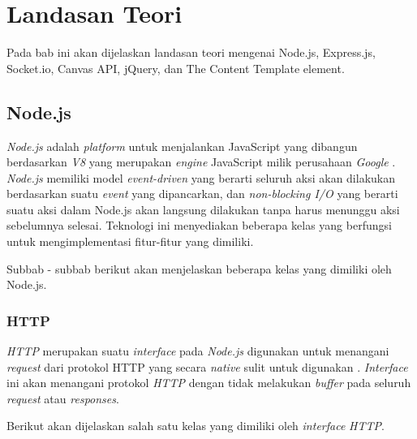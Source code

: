 \chapter{Landasan Teori}
\label{chap:teori}

Pada bab ini akan dijelaskan landasan teori mengenai Node.js, Express.js, Socket.io, Canvas API, jQuery, dan The Content Template element.

\section{Node.js}
\label{sec:Node.js}

\textit{Node.js} adalah \textit{platform} untuk menjalankan JavaScript yang dibangun berdasarkan \textit{V8} yang merupakan \textit{engine} JavaScript milik perusahaan \textit{Google} \cite{dahl:09:nodejsdocs}. \textit{Node.js} memiliki model \textit{event-driven} yang berarti seluruh aksi akan dilakukan berdasarkan suatu \textit{event} yang dipancarkan, dan \textit{non-blocking I/O} yang berarti suatu aksi dalam Node.js akan langsung dilakukan tanpa harus menunggu aksi sebelumnya selesai. Teknologi ini menyediakan beberapa kelas yang berfungsi untuk mengimplementasi fitur-fitur yang dimiliki.

Subbab - subbab berikut akan menjelaskan beberapa kelas yang dimiliki oleh Node.js.

\subsection{HTTP}
\textit{HTTP} merupakan suatu \textit{interface} pada \textit{Node.js} digunakan untuk menangani \textit{request} dari protokol HTTP yang secara \textit{native} sulit untuk digunakan \cite{dahl:09:nodejsdocs}. \textit{Interface} ini akan menangani protokol \textit{HTTP} dengan tidak melakukan \textit{buffer} pada seluruh \textit{request} atau \textit{responses}.

Berikut akan dijelaskan salah satu kelas yang dimiliki oleh \textit{interface} \textit{HTTP}.

